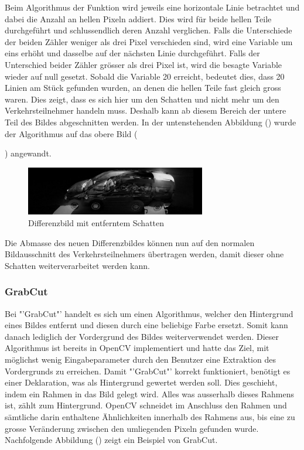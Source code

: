 Beim Algorithmus der Funktion wird jeweils eine horizontale Linie betrachtet und dabei die Anzahl an hellen Pixeln addiert. Dies wird für beide hellen Teile durchgeführt und schlussendlich deren Anzahl verglichen. Falls die Unterschiede der beiden Zähler weniger als drei Pixel verschieden sind, wird eine Variable um eins erhöht und dasselbe auf der nächsten Linie durchgeführt. Falls der Unterschied beider Zähler grösser als drei Pixel ist, wird die besagte Variable wieder auf null gesetzt. Sobald die Variable 20 erreicht, bedeutet dies, dass 20 Linien am Stück gefunden wurden, an denen die hellen Teile fast gleich gross waren. Dies zeigt, dass es sich hier um den Schatten und nicht mehr um den Verkehrsteilnehmer handeln muss. Deshalb kann ab diesem Bereich der untere Teil des Bildes abgeschnitten werden. In der untenstehenden Abbildung () wurde der Algorithmus auf das obere Bild ({) angewandt.

\begin{figure}[H]
  \centering
  \includegraphics[width=0.7\textwidth]{Testversuche/RemoveShadow.jpg} 
  \caption{Differenzbild mit entferntem Schatten}
  \label{bRemoveShadow}
\end{figure}

Die Abmasse des neuen Differenzbildes können nun auf den normalen Bildausschnitt des Verkehrsteilnehmers übertragen werden, damit dieser ohne Schatten weiterverarbeitet werden kann.

\subsubsection{GrabCut}
Bei "'GrabCut"' handelt es sich um einen Algorithmus, welcher den Hintergrund eines Bildes entfernt und diesen durch eine beliebige Farbe ersetzt. Somit kann danach lediglich der Vordergrund des Bildes weiterverwendet werden. Dieser Algorithmus ist bereits in OpenCV implementiert und hatte das Ziel, mit möglichst wenig Eingabeparameter durch den Benutzer eine Extraktion des Vordergrunds zu erreichen. Damit "'GrabCut"' korrekt funktioniert, benötigt es einer Deklaration, was als Hintergrund gewertet werden soll. Dies geschieht, indem ein Rahmen in das Bild gelegt wird. Alles was ausserhalb dieses Rahmens ist, zählt zum Hintergrund. OpenCV schneidet im Anschluss den Rahmen und sämtliche darin enthaltene Ähnlichkeiten innerhalb des Rahmens aus, bis eine zu grosse Veränderung zwischen den umliegenden Pixeln gefunden wurde. Nachfolgende Abbildung () zeigt ein Beispiel von GrabCut.

}
